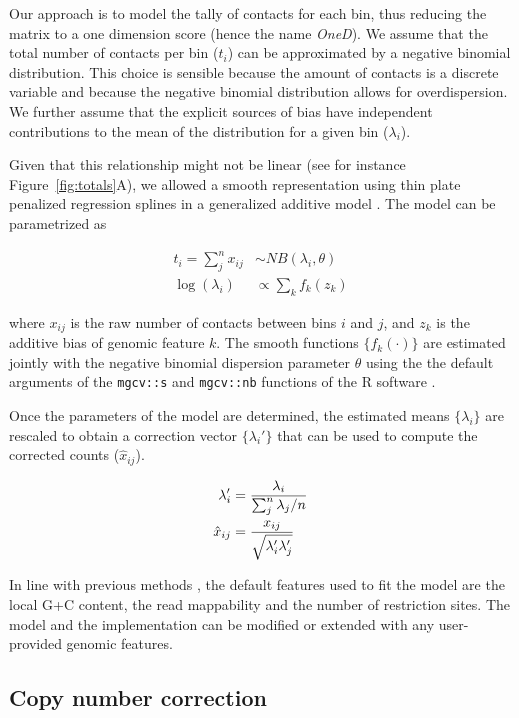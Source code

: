 \documentclass[a4,center,fleqn]{NAR}
\begin{document}
Our approach is to model the tally of contacts for each bin, thus reducing
the matrix to a one dimension score (hence the name \textit{OneD}). We
assume that the total number of contacts per bin ($t_{i}$) can be
approximated by a negative binomial distribution. This choice is sensible
because the amount of contacts is a discrete variable and because the
negative binomial distribution allows for overdispersion. We further
assume that the explicit sources of bias have independent contributions to
the mean of the distribution for a given bin ($\lambda_i$).

Given that this relationship might not be linear (see for instance
Figure~\ref{fig:totals}A), we allowed a smooth representation
using thin plate penalized regression splines \citep{wood2003thin} in a
generalized additive model \citep{wood2011fast}. The model can be
parametrized as

\begin{align*}
t_i = \sum_j^n{x_{ij}} &\sim  NB(\lambda_i, \theta) \\
\log(\lambda_i) &\propto \sum_{k}{f_k(z_k)}
\end{align*}

\noindent
where $x_{ij}$ is the raw number of contacts between bins $i$ and $j$, and
$z_k$ is the additive bias of genomic feature $k$. The smooth functions
$\{f_k(\cdot)\}$ are estimated jointly with the negative binomial
dispersion parameter $\theta$ using the the default arguments of the
\texttt{mgcv::s} and \texttt{mgcv::nb} functions \citep{wood2011fast} of the R
software \citep{coreteam2014r}.


Once the parameters of the model are determined, the estimated means
$\{\lambda_i\}$ are rescaled to obtain a correction vector
$\{\lambda_i'\}$ that can be used to compute the corrected counts
($\hat{x}_{ij}$).

\begin{align}
\notag
\lambda_i' &= \frac{\lambda_i}{\sum_j^n{\lambda_j}/n} \\
\label{eq:xhat}
\hat{x}_{ij} &= \frac{x_{ij}}{\sqrt{\lambda_i'\lambda_j'}}
\end{align}

In line with previous methods
\citep{yaffe2011probabilistic,hu2012hicnorm}, the default features
used to fit the model are the local G+C content, the read mappability and
the number of restriction sites. The model and the
implementation can be modified or extended with any user-provided genomic
features.

\subsection{Copy number correction}
\end{document}
